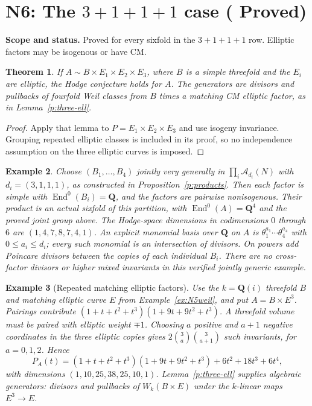 \documentclass[10pt,reqno]{article}
\theoremstyle{emphasizedplain}
\DeclareRobustCommand{\provedstatus}{%
  \texorpdfstring{\textcolor{ProvedGreen}{\textbf{Proved}}}{Proved}}
\newtheorem{theorem}{Theorem}[section]
\theoremstyle{emphasizeddefinition}
\newtheorem{example}[theorem]{Example}
\theoremstyle{emphasizeddefinition}
\DeclareMathOperator{\End}{End}
\newcommand{\Q}{\mathbf Q}
\newcommand{\status}[1]{%
  \par\nobreak\smallskip\noindent
  {\setlength{\fboxsep}{7pt}%
   \colorbox{ScopeBackground}{%
    \parbox{\dimexpr\linewidth-2\fboxsep\relax}{%
     \small\textbf{\textcolor{HeadingInk}{Scope and status.}} #1}}}%
  \par\nobreak\medskip}
\renewcommand{\small}{\fontsize{8.4}{10}\selectfont}
\begin{document}
\section{N6: The \texorpdfstring{$3+1+1+1$}{3+1+1+1} case (\provedstatus)}\label{sec:N6}

\status{Proved for every sixfold in the $3+1+1+1$ row. Elliptic
factors may be isogenous or have CM.}
\begin{theorem}
If $A\sim B\times E_1\times E_2\times E_3$, where $B$ is a simple
threefold and the $E_i$ are elliptic, the Hodge conjecture holds for $A$.
The generators are divisors and pullbacks of fourfold Weil classes from
$B$ times a matching CM elliptic factor, as in Lemma~\ref{p:three-ell}.
\end{theorem}
\begin{proof}
Apply that lemma to $P=E_1\times E_2\times E_3$ and use isogeny
invariance. Grouping repeated elliptic classes is included in its proof,
so no independence assumption on the three elliptic curves is imposed.
\end{proof}
\begin{example}
Choose $(B_1,\ldots,B_{4})$ jointly very generally in
$\prod_i\mathcal A_{d_i}(N)$ with $d_i=(3,1,1,1)$,
as constructed in Proposition~\ref{p:products}. Then each factor is
simple with $\End^0(B_i)=\Q$, and the factors are pairwise nonisogenous.
Their product is an actual sixfold of this partition, with
$\End^0(A)=\Q^{4}$ and the proved joint group above.
The Hodge-space dimensions in codimensions $0$ through $6$ are
$(1,4,7,8,7,4,1)$.
An explicit monomial basis over $\Q$ on $A$ is
$\theta_1^{a_1}\cdots\theta_{4}^{a_{4}}$ with
$0\leq a_i\leq d_i$; every such monomial is an intersection of divisors.
On powers add Poincare divisors between the copies of each individual
$B_i$. There are no cross-factor divisors or higher mixed invariants in
this verified jointly generic example.
\end{example}
\begin{example}[Repeated matching elliptic factors]
Use the $k=\Q(i)$ threefold $B$ and matching elliptic curve $E$
from Example~\ref{ex:N5weil}, and put $A=B\times E^3$. Pairings contribute
$(1+t+t^2+t^3)(1+9t+9t^2+t^3)$.
A threefold volume must be paired with elliptic weight $\mp1$.
Choosing $a$ positive and $a+1$ negative coordinates in the three
elliptic copies gives $2\binom3a\binom3{a+1}$ such invariants,
for $a=0,1,2$. Hence
\[
 P_A(t)=(1+t+t^2+t^3)(1+9t+9t^2+t^3)+6t^2+18t^3+6t^4,
\]
with dimensions $(1,10,25,38,25,10,1)$.
Lemma~\ref{p:three-ell} supplies algebraic generators: divisors and
pullbacks of $W_k(B\times E)$ under the $k$-linear maps $E^3\to E$.
\end{example}
\end{document}
